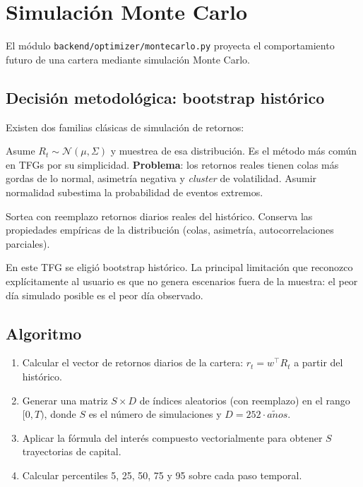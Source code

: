 \documentclass[11pt,a4paper]{article}
\begin{document}
\section{Simulación Monte Carlo}

El módulo \texttt{backend/optimizer/montecarlo.py} proyecta el comportamiento futuro de una cartera mediante simulación Monte Carlo.

\subsection{Decisión metodológica: bootstrap histórico}

Existen dos familias clásicas de simulación de retornos:

\begin{description}[leftmargin=1.4cm]
  \item[Modelo paramétrico Gaussiano] Asume $R_t \sim \mathcal{N}(\mu, \Sigma)$ y muestrea de esa distribución. Es el método más común en TFGs por su simplicidad. \textbf{Problema}: los retornos reales tienen colas más gordas de lo normal, asimetría negativa y \textit{cluster} de volatilidad. Asumir normalidad subestima la probabilidad de eventos extremos.
  \item[Bootstrap histórico] Sortea con reemplazo retornos diarios reales del histórico. Conserva las propiedades empíricas de la distribución (colas, asimetría, autocorrelaciones parciales).
\end{description}

\noindent En este TFG se eligió bootstrap histórico. La principal limitación que reconozco explícitamente al usuario es que no genera escenarios fuera de la muestra: el peor día simulado posible es el peor día observado.

\subsection{Algoritmo}

\begin{enumerate}
  \item Calcular el vector de retornos diarios de la cartera: $r_t = w^\top R_t$ a partir del histórico.
  \item Generar una matriz $S\times D$ de índices aleatorios (con reemplazo) en el rango $[0, T)$, donde $S$ es el número de simulaciones y $D = 252 \cdot a\tilde{n}os$.
  \item Aplicar la fórmula del interés compuesto vectorialmente para obtener $S$ trayectorias de capital.
  \item Calcular percentiles 5, 25, 50, 75 y 95 sobre cada paso temporal.
\end{enumerate}
\end{document}
